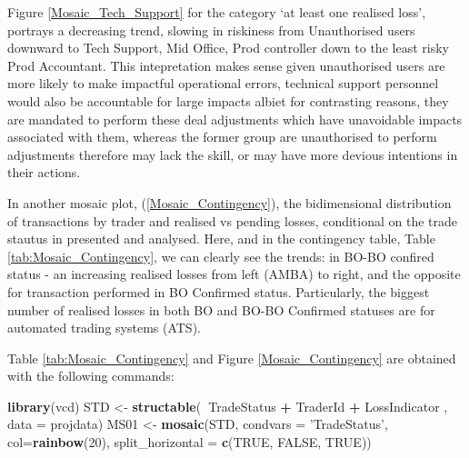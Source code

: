 \documentclass[]{DissertateUSU}
\newenvironment{Shaded}{\begin{snugshade}}{\end{snugshade}}
\newcommand{\KeywordTok}[1]{\textcolor[rgb]{0.13,0.29,0.53}{\textbf{#1}}}
\newcommand{\DataTypeTok}[1]{\textcolor[rgb]{0.13,0.29,0.53}{#1}}
\newcommand{\DecValTok}[1]{\textcolor[rgb]{0.00,0.00,0.81}{#1}}
\newcommand{\StringTok}[1]{\textcolor[rgb]{0.31,0.60,0.02}{#1}}
\newcommand{\OtherTok}[1]{\textcolor[rgb]{0.56,0.35,0.01}{#1}}
\newcommand{\OperatorTok}[1]{\textcolor[rgb]{0.81,0.36,0.00}{\textbf{#1}}}
\newcommand{\NormalTok}[1]{#1}
\begin{document}
Figure \ref{Mosaic_Tech_Support} for the category `at least one realised
loss', portrays a decreasing trend, slowing in riskiness from
Unauthorised users downward to Tech Support, Mid Office, Prod controller
down to the least risky Prod Accountant. This intepretation makes sense
given unauthorised users are more likely to make impactful operational
errors, technical support personnel would also be accountable for large
impacts albiet for contrasting reasons, they are mandated to perform
these deal adjustments which have unavoidable impacts associated with
them, whereas the former group are unauthorised to perform adjustments
therefore may lack the skill, or may have more devious intentions in
their actions.\medskip   

In another mosaic plot, (\ref{Mosaic_Contingency}), the bidimensional
distribution of transactions by trader and realised vs pending losses,
conditional on the trade stautus in presented and analysed. Here, and in
the contingency table, Table \ref{tab:Mosaic_Contingency}, we can
clearly see the trends: in BO-BO confired status - an increasing
realised losses from left (AMBA) to right, and the opposite for
transaction performed in BO Confirmed status. Particularly, the biggest
number of realised losses in both BO and BO-BO Confirmed statuses are
for automated trading systems (ATS).\medskip

Table \ref{tab:Mosaic_Contingency} and Figure \ref{Mosaic_Contingency}
are obtained with the following commands:

\singlespacing

\begin{Shaded}
\begin{Highlighting}[]
\KeywordTok{library}\NormalTok{(vcd)}
\NormalTok{STD <-}\StringTok{ }\KeywordTok{structable}\NormalTok{(}\OperatorTok{~}\NormalTok{TradeStatus }\OperatorTok{+}\StringTok{ }\NormalTok{TraderId }\OperatorTok{+}\StringTok{ }\NormalTok{LossIndicator}
\NormalTok{                                        , }\DataTypeTok{data =}\NormalTok{ projdata)}
\NormalTok{MS01 <-}\StringTok{ }\KeywordTok{mosaic}\NormalTok{(STD, }\DataTypeTok{condvars =} \StringTok{'TradeStatus'}\NormalTok{, }\DataTypeTok{col=}\KeywordTok{rainbow}\NormalTok{(}\DecValTok{20}\NormalTok{),}
                  \DataTypeTok{split_horizontal =} \KeywordTok{c}\NormalTok{(}\OtherTok{TRUE}\NormalTok{, }\OtherTok{FALSE}\NormalTok{, }\OtherTok{TRUE}\NormalTok{))}
\end{Highlighting}
\end{Shaded}
\end{document}
